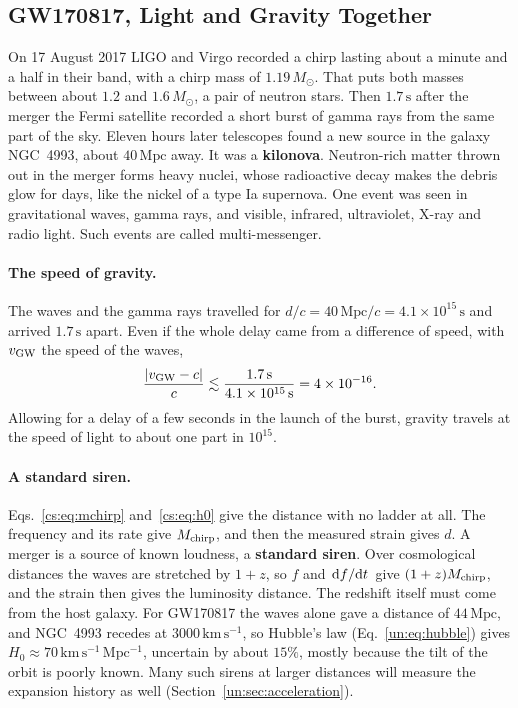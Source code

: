 \subsection{GW170817, Light and Gravity Together}
\label{cs:sec:gw170817}

On 17 August 2017 LIGO and Virgo recorded a chirp lasting about a minute and a half in their band, with a chirp mass of $1.19\,M_\odot$. That puts both masses between about $1.2$ and $1.6\,M_\odot$, a pair of neutron stars. Then $1.7\,\mathrm s$ after the merger the Fermi satellite recorded a short burst of gamma rays from the same part of the sky. Eleven hours later telescopes found a new source in the galaxy NGC~4993, about $40\,\mathrm{Mpc}$ away. It was a \textbf{kilonova}. Neutron-rich matter thrown out in the merger forms heavy nuclei, whose radioactive decay makes the debris glow for days, like the nickel of a type Ia supernova. One event was seen in gravitational waves, gamma rays, and visible, infrared, ultraviolet, X-ray and radio light. Such events are called multi-messenger.

\paragraph{The speed of gravity.} The waves and the gamma rays travelled for $d/c=40\,\mathrm{Mpc}/c=4.1\times10^{15}\,\mathrm s$ and arrived $1.7\,\mathrm s$ apart. Even if the whole delay came from a difference of speed, with $v_{\rm GW}$ the speed of the waves,
\[
\frac{|v_{\rm GW}-c|}{c}\lesssim\frac{1.7\,\mathrm s}{4.1\times10^{15}\,\mathrm s}=4\times10^{-16}.
\]
Allowing for a delay of a few seconds in the launch of the burst, gravity travels at the speed of light to about one part in $10^{15}$.

\paragraph{A standard siren.} Eqs.~\eqref{cs:eq:mchirp} and~\eqref{cs:eq:h0} give the distance with no ladder at all. The frequency and its rate give $M_{\rm chirp}$, and then the measured strain gives $d$. A merger is a source of known loudness, a \textbf{standard siren}. Over cosmological distances the waves are stretched by $1+z$, so $f$ and $\dv*{f}{t}$ give $(1+z)M_{\rm chirp}$, and the strain then gives the luminosity distance. The redshift itself must come from the host galaxy. For GW170817 the waves alone gave a distance of $44\,\mathrm{Mpc}$, and NGC~4993 recedes at $3000\,\mathrm{km\,s^{-1}}$, so Hubble's law (Eq.~\eqref{un:eq:hubble}) gives $H_0\approx70\,\mathrm{km\,s^{-1}\,Mpc^{-1}}$, uncertain by about $15\%$, mostly because the tilt of the orbit is poorly known. Many such sirens at larger distances will measure the expansion history as well (Section~\ref{un:sec:acceleration}).

